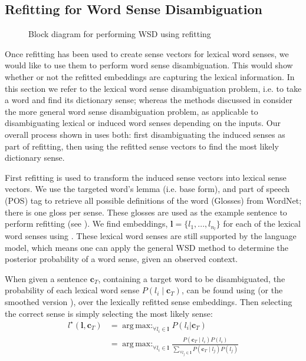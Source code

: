 \documentclass{article}
\renewcommand{\c}{\mathbf{c}}
\renewcommand{\l}{\mathbf{l}}
\DeclareMathOperator*{\argmax}{arg\,max:}
\begin{document}
\subsection{Refitting for Word Sense Disambiguation} 
\begin{figure}
	\begin{adjustbox}{max width=\columnwidth}
		
	\end{adjustbox}
	\caption{Block diagram for performing WSD using refitting \label{WSDBlock}} 
\end{figure}
Once refitting has been used to create sense vectors for lexical word senses, we would like to use them to perform word sense disambiguation. This would show whether or not the refitted embeddings are capturing the lexical information. In this section we refer to the lexical word sense disambiguation problem, i.e. to take a word and find its dictionary sense; whereas the methods discussed in  consider the more general word sense disambiguation problem, as applicable to disambiguating lexical or induced word senses depending on the inputs.
Our overall process shown in  uses both: first disambiguating the induced senses as part of refitting, then using the refitted sense vectors to find the most likely dictionary sense.

First refitting is used to transform the induced sense vectors into lexical sense vectors.
We use the targeted word's lemma (i.e. base form), and part of speech (POS) tag to retrieve all possible definitions of the word (Glosses) from WordNet; there is one gloss per sense. These glosses are used as the example sentence to perform refitting (see ). We find embeddings, $\l=\{l_1,..., l_{n_l}\}$ for each of the lexical word senses using . These lexical word senses are still supported by the language model, which means one can apply the general WSD method to determine the posterior probability of a word sense, given an observed context. 

When given a sentence $\c_{T}$, containing a target word to be disambiguated, 
the probability of each lexical word sense $P(l_i \mid \c_{T})$, can be found using  (or the smoothed version ), over the lexically refitted sense embeddings. Then selecting the correct sense is simply selecting the most likely sense:
\begin{equation}
\begin{aligned}\label{eq:lexicalwsd}
l^\star (\l, \c_T) &= \argmax_{\forall l_i \in \l} P(l_i|\c_T) \\
&= \argmax_{\forall l_i \in \l} \frac{P(\c_T \mid l_i)P(l_i)}{\sum_{\forall l_j \in \l} P(\c_T \mid l_j)P(l_j)}
\end{aligned}
\end{equation}
\end{document}

